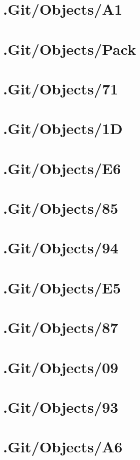 \section*{.Git/Objects/A1}

\section*{.Git/Objects/Pack}

\section*{.Git/Objects/71}

\section*{.Git/Objects/1D}

\section*{.Git/Objects/E6}

\section*{.Git/Objects/85}

\section*{.Git/Objects/94}

\section*{.Git/Objects/E5}

\section*{.Git/Objects/87}

\section*{.Git/Objects/09}

\section*{.Git/Objects/93}

\section*{.Git/Objects/A6}

